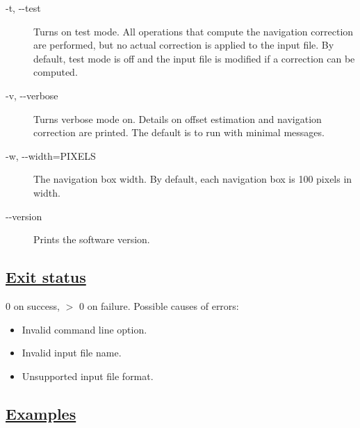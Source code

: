 \begin{description}
\item[ -t, -{-}test ] Turns on test mode. All operations that compute the navigation correction are performed, but no actual correction is applied to the input file. By default, test mode is off and the input file is modified if a correction can be computed. 
\item[ -v, -{-}verbose ] Turns verbose mode on. Details on offset estimation and navigation correction are printed. The default is to run with minimal messages. 
\item[ -w, -{-}width=PIXELS ] The navigation box width. By default, each navigation box is 100 pixels in width. 
\item[-{-}version]Prints the software version.

\end{description}
\subsection*{\underline{Exit status}}


  0 on success, $>$ 0 on failure. Possible causes of errors:
\begin{itemize}
\item  Invalid command line option. 
\item  Invalid input file name. 
\item  Unsupported input file format. 

\end{itemize}
\subsection*{\underline{Examples}}


